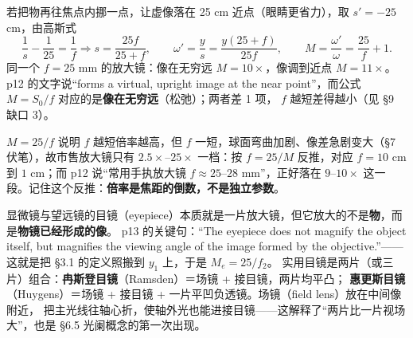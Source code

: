 ﻿\documentclass[11pt]{ctexart}
\begin{document}

若把物再往焦点内挪一点，让虚像落在 25 cm 近点（眼睛更省力），取 $s'=-25$ cm，由高斯式
\[
\frac{1}{s}-\frac{1}{25}=\frac{1}{f}\Rightarrow s=\frac{25f}{25+f},
\qquad
\omega'=\frac{y}{s}=\frac{y(25+f)}{25f},
\qquad
M=\frac{\omega'}{\omega}=\frac{25}{f}+1 .
\]
同一个 $f=25$ mm 的放大镜：像在无穷远 $M=10\times$，像调到近点 $M=11\times$。p12 的文字说“forms a virtual,
upright image at the near point”，而公式 $M=S_0/f$ 对应的是\textbf{像在无穷远}（松弛）；两者差 1 项，
$f$ 越短差得越小（见 §9 缺口 3）。


$M=25/f$ 说明 $f$ 越短倍率越高，但 $f$ 一短，球面弯曲加剧、像差急剧变大（§7 伏笔），故市售放大镜只有
$2.5\times$--$25\times$ 一档：按 $f=25/M$ 反推，对应 $f=10$ cm 到 $1$ cm；而 p12 说“常用手执放大镜
$f\approx25$--$28$ mm”，正好落在 $9$--$10\times$ 这一段。记住这个反推：\textbf{倍率是焦距的倒数，不是独立参数}。


显微镜与望远镜的目镜（eyepiece）本质就是一片放大镜，但它放大的不是\textbf{物}，而是\textbf{物镜已经形成的像}。
p13 的关键句：“The eyepiece does not magnify the object itself, but magnifies the viewing angle of the image
formed by the objective.”——这就是把 §3.1 的定义照搬到 $y_1$ 上，于是 $M_e=25/f_2$。
实用目镜是两片（或三片）组合：\textbf{冉斯登目镜}（Ramsden）＝场镜 + 接目镜，两片均平凸；
\textbf{惠更斯目镜}（Huygens）＝场镜 + 接目镜 + 一片平凹负透镜。场镜（field lens）放在中间像附近，
把主光线往轴心折，使轴外光也能进接目镜——这解释了“两片比一片视场大”，也是 §6.5 光阑概念的第一次出现。

\end{document}
